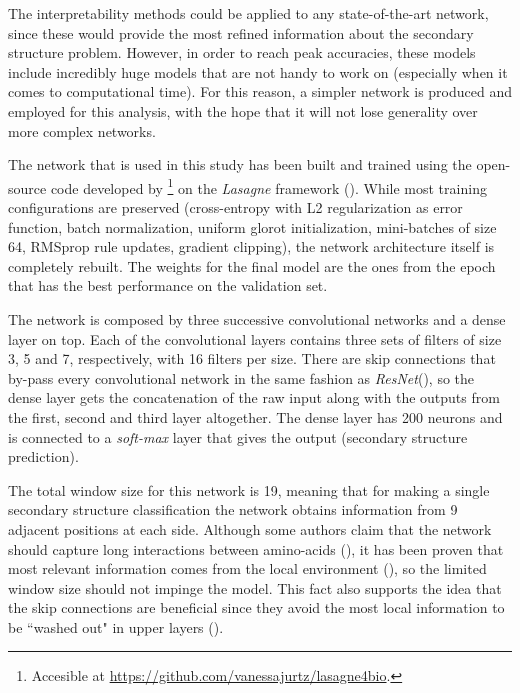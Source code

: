 The interpretability methods could be applied to any state-of-the-art network, since these would provide the most refined information about the secondary structure problem. However, in order to reach peak accuracies, these models include incredibly huge models that are not handy to work on (especially when it comes to computational time). For this reason, a simpler network is produced and employed for this analysis, with the hope that it will not lose generality over more complex networks.

The network that is used in this study has been built and trained using the open-source code developed by \cite{Jurtz2017}\footnote{Accesible at \url{https://github.com/vanessajurtz/lasagne4bio}.} on the \textit{Lasagne} framework (\cite{Dieleman2015}). While most training configurations are preserved (cross-entropy with L2 regularization as error function, batch normalization, uniform glorot initialization, mini-batches of size 64, RMSprop rule updates, gradient clipping), the network architecture itself is completely rebuilt. The weights for the final model are the ones from the epoch that has the best performance on the validation set.

The network is composed by three successive convolutional networks and a dense layer on top. Each of the convolutional layers contains three sets of filters of size 3, 5 and 7, respectively, with 16 filters per size. There are skip connections that by-pass every convolutional network in the same fashion as \textit{ResNet}(\cite{He2015}), so the dense layer gets the concatenation of the raw input along with the outputs from the first, second and third layer altogether.
The dense layer has 200 neurons and is connected to a \textit{soft-max} layer that gives the output (secondary structure prediction).

The total window size for this network is 19, meaning that for making a single secondary structure classification the network obtains information from 9 adjacent positions at each side. Although some authors claim that the network should capture long interactions between amino-acids (\cite{Li2016,Lin2016,Hattori2017,Heffernan2017}), it has been proven that most relevant information comes from the local environment (\cite{Busia2017}), so the limited window size should not impinge the model. This fact also supports the idea that the skip connections are beneficial since they avoid the most local information to be ``washed out" in upper layers (\cite{Busia2017}).

		
